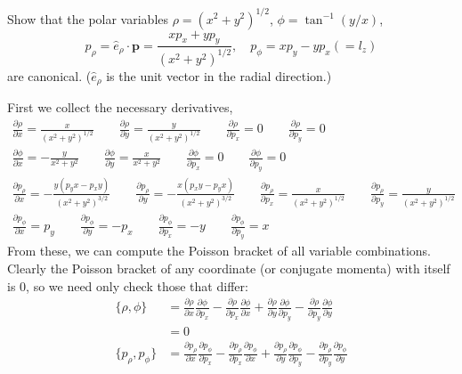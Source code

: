 \documentclass[../principles-of-quantum-mechanics.tex]{subfiles}
\begin{document}
\begin{questions}
		\question Show that the polar variables $\rho = (x^2+y^2)^{1/2}$, $\phi = \tan^{-1}(y/x)$,
		\[
			p_\rho = \hat{e}_\rho\cdot\mathbf{p} = \frac{xp_x + yp_y}{(x^2 + y^2)^{1/2}}, \quad p_\phi = xp_y - yp_x (= l_z)
		\]
		are canonical. ($\hat{e}_\rho$ is the unit vector in the radial direction.)
		
		\begin{solution}
			First we collect the necessary derivatives,
			\begin{gather*}
				\frac{\partial\rho}{\partial x} = \frac{x}{(x^2 + y^2)^{1/2}} \qquad \frac{\partial\rho}{\partial y} = \frac{y}{(x^2+y^2)^{1/2}} \qquad \frac{\partial\rho}{\partial p_x} = 0 \qquad \frac{\partial\rho}{\partial p_y} = 0 \\
				\frac{\partial\phi}{\partial x} = -\frac{y}{x^2+y^2} \qquad \frac{\partial\phi}{\partial{y}} = \frac{x}{x^2+y^2} \qquad \frac{\partial\phi}{\partial p_x} = 0 \qquad \frac{\partial\phi}{\partial p_y} = 0 \\
				\frac{\partial p_\rho}{\partial{x}} = -\frac{y(p_yx - p_xy)}{(x^2+y^2)^{3/2}} \qquad \frac{\partial p_\rho}{\partial{y}} = -\frac{x(p_xy - p_yx)}{(x^2+y^2)^{3/2}} \qquad \frac{\partial p_\rho}{\partial p_x} = \frac{x}{(x^2+y^2)^{1/2}} \qquad \frac{\partial p_\rho}{\partial p_y} = \frac{y}{(x^2+y^2)^{1/2}} \\
				\frac{\partial p_\phi}{\partial x} = p_y \qquad \frac{\partial p_\phi}{\partial y} = -p_x \qquad \frac{\partial p_\phi}{\partial p_x} = -y \qquad \frac{\partial p_\phi}{\partial p_y} = x
			\end{gather*}
			From these, we can compute the Poisson bracket of all variable combinations. Clearly the Poisson bracket of any coordinate (or conjugate momenta) with itself is $0$, so we need only check those that differ:
			\begin{align*}
				\{\rho, \phi\} &= \frac{\partial\rho}{\partial{x}}\frac{\partial\phi}{\partial p_x} - \frac{\partial\rho}{\partial{p_x}}\frac{\partial\phi}{\partial x} + \frac{\partial\rho}{\partial{y}}\frac{\partial\phi}{\partial p_y} - \frac{\partial\rho}{\partial{p_y}}\frac{\partial\phi}{\partial y}  \\
				&= 0 \\
				\{p_\rho, p_\phi\} &= \frac{\partial p_\rho}{\partial{x}}\frac{\partial p_\phi}{\partial p_x} - \frac{\partial p_\rho}{\partial{p_x}}\frac{\partial p_\phi}{\partial x} + \frac{\partial p_\rho}{\partial{y}}\frac{\partial p_\phi}{\partial p_y} - \frac{\partial p_\rho}{\partial{p_y}}\frac{\partial p_\phi}{\partial y} \\

\end{align*}
\end{solution}
\end{questions}
\end{document}
